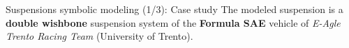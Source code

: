 
\begin{frame}{Suspensions symbolic modeling (1/3): Case study}
  The modeled suspension is a \textbf{double wishbone} suspension system of the \textbf{Formula SAE} vehicle of \emph{E-Agle Trento Racing Team} (University of Trento). \\[1.0em]
  \begin{center}
    \begin{minipage}[c]{0.65\textwidth}
      \centering
    \end{minipage}
    \hspace*{1em}
    \begin{minipage}[c]{0.25\textwidth}
      \centering
    \end{minipage}
  \end{center}
\end{frame}

